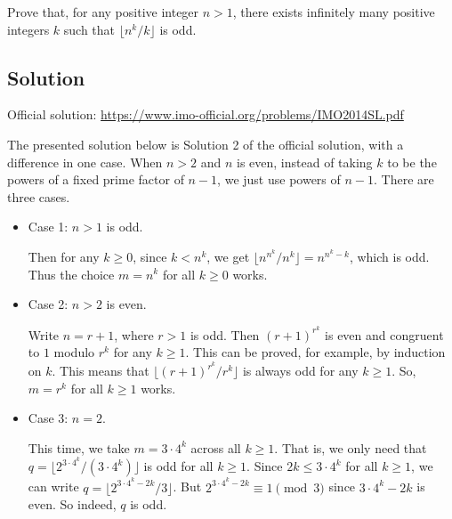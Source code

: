 Prove that, for any positive integer $n > 1$, there exists infinitely many positive integers $k$ such that $\lfloor n^k/k \rfloor$ is odd.



\subsection*{Solution}

Official solution: \url{https://www.imo-official.org/problems/IMO2014SL.pdf}

The presented solution below is Solution 2 of the official solution, with a difference in one case.
When $n > 2$ and $n$ is even, instead of taking $k$ to be the powers of a fixed prime factor of $n - 1$, we just use powers of $n - 1$.
There are three cases.

\begin{itemize}

    \item 
    Case 1: $n > 1$ is odd.

    Then for any $k \geq 0$, since $k < n^k$, we get $\lfloor n^{n^k}/n^k \rfloor = n^{n^k - k}$, which is odd.
    Thus the choice $m = n^k$ for all $k \geq 0$ works.

    \item
    Case 2: $n > 2$ is even.

    Write $n = r + 1$, where $r > 1$ is odd.
    Then $(r + 1)^{r^k}$ is even and congruent to $1$ modulo $r^k$ for any $k \geq 1$.
    This can be proved, for example, by induction on $k$.
    This means that $\lfloor (r + 1)^{r^k}/r^k \rfloor$ is always odd for any $k \geq 1$.
    So, $m = r^k$ for all $k \geq 1$ works.

    \item
    Case 3: $n = 2$.

    This time, we take $m = 3 \cdot 4^k$ across all $k \geq 1$.
    That is, we only need that $q = \lfloor 2^{3 \cdot 4^k}/(3 \cdot 4^k) \rfloor$ is odd for all $k \geq 1$.
    Since $2k \leq 3 \cdot 4^k$ for all $k \geq 1$, we can write $q = \lfloor 2^{3 \cdot 4^k - 2k}/3 \rfloor$.
    But $2^{3 \cdot 4^k - 2k} \equiv 1 \pmod{3}$ since $3 \cdot 4^k - 2k$ is even.
    So indeed, $q$ is odd.

\end{itemize}
